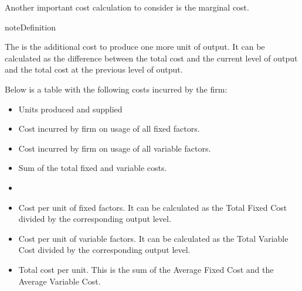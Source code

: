 \documentclass[letterpaper,10pt,english]{jupyterBook}
\begin{document}
\sphinxAtStartPar
Another important cost calculation to consider is the marginal cost.

\begin{sphinxadmonition}{note}{Definition}

\sphinxAtStartPar
The  is the additional cost to produce one more unit of output. It can be calculated as the difference between the total cost and the current level of output and the total cost at the previous level of output.
\end{sphinxadmonition}

\sphinxAtStartPar
Below is a table with the following costs incurred by the firm:
\begin{itemize}
\item {} 
\sphinxAtStartPar
{} Units produced and supplied

\item {} 
\sphinxAtStartPar
{} Cost incurred by firm on usage of all fixed factors.

\item {} 
\sphinxAtStartPar
{} Cost incurred by firm on usage of all variable factors.

\item {} 
\sphinxAtStartPar
{} Sum of the total fixed and variable costs.

\item {} 
\sphinxAtStartPar
{}

\item {} 
\sphinxAtStartPar
{} Cost per unit of fixed factors. It can be calculated as the Total Fixed Cost divided by the corresponding output level.

\item {} 
\sphinxAtStartPar
{} Cost per unit of variable factors. It can be calculated as the Total Variable Cost divided by the corresponding output level.

\item {} 
\sphinxAtStartPar
{} Total cost per unit. This is the sum of the Average Fixed Cost and the Average Variable Cost.

\end{itemize}

\begin{sphinxVerbatim}[commandchars=\\\{\}]
  
\end{sphinxVerbatim}
\end{document}
